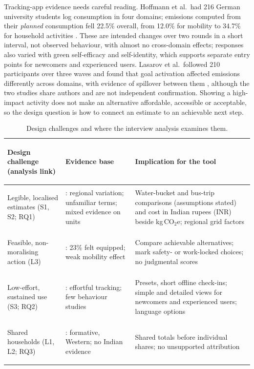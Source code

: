 \documentclass[12pt, a4paper]{article}
\begin{document}
Tracking-app evidence needs careful reading. Hoffmann et al.\ had 216 German university students log consumption in four domains; emissions computed from their \emph{planned} consumption fell 22.5\% overall, from 12.0\% for mobility to 34.7\% for household activities \cite{hoffmann2024}. These are intended changes over two rounds in a short interval, not observed behaviour, with almost no cross-domain effects; responses also varied with green self-efficacy and self-identity, which supports separate entry points for newcomers and experienced users. Lasarov et al.\ followed 210 participants over three waves and found that goal activation affected emissions differently across domains, with evidence of spillover between them \cite{lasarov2024}, although the two studies share authors and are not independent confirmation. Showing a high-impact activity does not make an alternative affordable, accessible or acceptable, so the design question is how to connect an estimate to an achievable next step.

\begin{table}[t]
\centering
\footnotesize
\setlength{\tabcolsep}{4pt}
\caption{Design challenges and where the interview analysis examines them.}
\label{tab:challenges}
\begin{tabularx}{\textwidth}{>{\bfseries\raggedright\arraybackslash}p{4.7cm} p{4.5cm} X}
\toprule
\textbf{Design challenge (analysis link)} & \textbf{Evidence base} & \textbf{Implication for the tool}\\
\midrule
Legible, localised estimates (S1, S2; RQ1) & \cite{lee2021,gandhi2025,grinstein2018,mohanty2023,shi2021}: regional variation; unfamiliar terms; mixed evidence on units & Water-bucket and bus-trip comparisons (assumptions stated) and cost in Indian rupees (INR) beside kg\,CO$_2$e; regional grid factors\\
Feasible, non-moralising action (L3) & \cite{collins2020,hoffmann2024,brynjarsdottir2012}: 23\% felt equipped; weak mobility effect & Compare achievable alternatives; mark safety- or work-locked choices; no judgmental scores\\
Low-effort, sustained use (S3; RQ2) & \cite{hoffmann2024,froehlich2010}: effortful tracking; few behaviour studies & Presets, short offline check-ins; simple and detailed views for newcomers and experienced users; language options\\
Shared households (L1, L2; RQ3) & \cite{froehlich2012,tiefenbeck2019}: formative, Western; no Indian evidence & Shared totals before individual shares; no unsupported attribution\\
\bottomrule
\end{tabularx}
\end{table}
\end{document}
